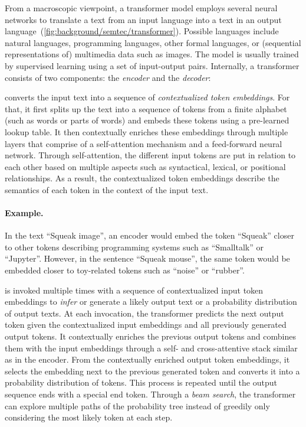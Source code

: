 From a macroscopic viewpoint, a transformer model employs several neural networks to translate a text from an input language into a text in an output language~(\cref{fig:background/semtec/transformer}).
Possible languages include natural languages, programming languages, other formal languages, or (sequential representations of) multimedia data such as images.
The model is usually trained by supervised learning using a set of input-output pairs.
Internally, a transformer consists of two components: the \emph{encoder} and the \emph{decoder}:

\begin{description}[noextralabelsep]
	\item[The encoder] converts the input text into a sequence of \emph{contextualized token embeddings}.
	For that, it first splits up the text into a sequence of tokens from a finite alphabet (such as words or parts of words) and embeds these tokens using a pre-learned lookup table.
	It then contextually enriches these embeddings through multiple layers that comprise of a self-attention mechanism and a feed-forward neural network.
	Through self-attention, the different input tokens are put in relation to each other based on multiple aspects such as syntactical, lexical, or positional relationships.
	As a result, the contextualized token embeddings describe the semantics of each token in the context of the input text.

	\begin{example}
		\paragraph{Example.}
		In the text ``Squeak image'', an encoder would embed the token ``Squeak'' closer to other tokens describing programming systems such as ``Smalltalk'' or ``Jupyter''.
		However, in the sentence ``Squeak mouse'', the same token would be embedded closer to toy-related tokens such as ``noise'' or ``rubber''.
	\end{example}

	\item[The decoder] is invoked multiple times with a sequence of contextualized input token embeddings to \emph{infer} or generate a likely output text or a probability distribution of output texts.
	At each invocation, the transformer predicts the next output token given the contextualized input embeddings and all previously generated output tokens.
	It contextually enriches the previous output tokens and combines them with the input embeddings through a self- and cross-attentive stack similar as in the encoder.
	From the contextually enriched output token embeddings, it selects the embedding next to the previous generated token and converts it into a probability distribution of tokens.
	This process is repeated until the output sequence ends with a special end token.
	Through a \emph{beam search}, the transformer can explore multiple paths of the probability tree instead of greedily only considering the most likely token at each step.


\end{description}
